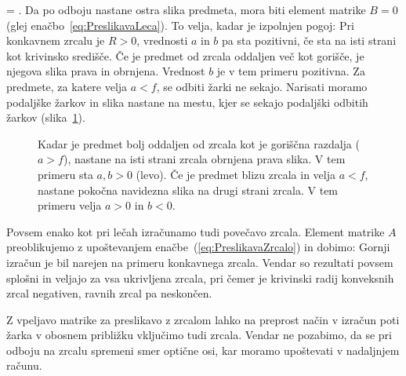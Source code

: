 \cdot
\left[\begin{array}{cc}
1& a\\
0&1
\end{array}\right]
= 
\!\!.
\label{eq:02_64}
\eeq
Da po odboju nastane ostra slika predmeta, mora biti element matrike $B=0$ 
(glej enačbo~\ref{eq:PreslikavaLeca}). To velja, kadar je izpolnjen pogoj:
Pri konkavnem zrcalu je $R>0$, vrednosti $a$ in $b$ pa sta pozitivni, če sta 
na isti strani kot krivinsko središče. Če je predmet od zrcala oddaljen več 
kot gorišče, je njegova slika prava in obrnjena. Vrednost $b$ je v tem primeru pozitivna.
Za predmete, za katere velja $a<f$, se odbiti žarki ne sekajo. Narisati
moramo podaljške žarkov in slika nastane na mestu, kjer se sekajo podaljški odbitih
žarkov (slika~\ref{fig:02_zrcaloodboj}).
\begin{figure}[!ht]
\centering
\def\svgwidth{140truemm} 

\caption{Kadar je predmet bolj oddaljen od zrcala kot je goriščna razdalja ($a>f$),
nastane na isti strani zrcala obrnjena prava slika. 
V tem primeru sta $a,b>0$ (levo). Če je predmet blizu zrcala in velja $a<f$,
nastane pokočna navidezna slika na drugi strani zrcala. V tem primeru velja $a>0$ in $b<0$.}
\label{fig:02_zrcaloodboj}
\end{figure}

Povsem enako kot pri lečah izračunamo tudi povečavo zrcala. Element matrike $A$
preoblikujemo z upoštevanjem enačbe~(\ref{eq:PreslikavaZrcalo}) in dobimo:
Gornji izračun je bil narejen na primeru konkavnega zrcala. Vendar so rezultati
povsem splošni in veljajo za vsa ukrivljena zrcala, pri čemer
je krivinski radij konveksnih zrcal negativen, ravnih zrcal pa neskončen. 

Z vpeljavo matrike za preslikavo z zrcalom lahko na preprost način v izračun
poti žarka v obosnem približku vključimo tudi zrcala. Vendar ne pozabimo, da se
pri odboju na zrcalu spremeni smer optične osi, kar moramo upoštevati v nadaljnjem računu.

